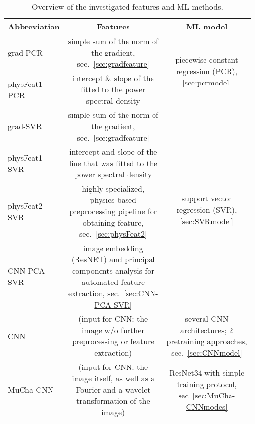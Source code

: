 \documentclass[11pt, authoryear]{elsarticle}
\begin{document}
	\begin{table}
		\centering\small
		\begin{tabular}{p{2.8cm}c{7.6cm}c{4cm}} %
			\toprule
			\bf Abbreviation  & \bf Features & \bf ML model  
			\\	\midrule
			grad-PCR      & simple sum of the norm of the gradient, sec.~\ref{sec:gradfeature}
			& \multirow[c]{2}{3cm}[-0.1em]{\centering piecewise constant regression (PCR), \cref{sec:pcrmodel}}
			\\ \cmidrule(r){1-2}
			\vspace{0pt}physFeat1-PCR & intercept \& slope of the fitted to the power spectral density
			&  
			\\\cmidrule(r){1-3}
			grad-SVR      & simple sum of the norm of the gradient, sec.~\ref{sec:gradfeature} 
			& \multirow[c]{4}{2.4cm}[-3em]{\centering support vector regression (SVR), \cref{sec:SVRmodel}}
			\\ \cmidrule(r){1-2}
			\vspace{0pt}physFeat1-SVR & intercept and slope of the line that was fitted to the power spectral density
			&  
			\\ \cmidrule(r){1-2}
			\vspace{0pt}physFeat2-SVR & highly-specialized, physics-based preprocessing pipeline for obtaining feature, sec.~\ref{sec:physFeat2}
			&  
			\\ \cmidrule(r){1-2}
			\vspace{0pt}CNN-PCA-SVR &  image embedding (ResNET) and principal components analysis for automated feature extraction, sec.~\ref{sec:CNN-PCA-SVR}
			& 
			\\\cmidrule(r){1-3}
			\vspace{0pt}CNN & \smallskip (input for CNN: the image w/o further preprocessing or feature extraction)
			& several CNN architectures; 2 pretraining approaches,
			sec.~\ref{sec:CNNmodel}
			\\\cmidrule(r){1-3}
			\vspace{0pt} MuCha-CNN & (input for CNN: the image itself, as well as a Fourier and a wavelet transformation 
			of the image)            
			& ResNet34 with simple training protocol, sec~\ref{sec:MuCha-CNNmodes}
			\\ 
			\bottomrule
		\end{tabular}
		\caption{%
			Overview of the investigated features and \gls{ML} methods.
		}
		\label{table:MLmethods}
	\end{table}
	
\end{document}
